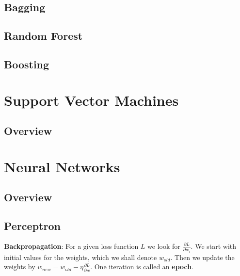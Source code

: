 \documentclass[aspectratio=169,10pt]{beamer}
\begin{document}
\subsection{Bagging}
\begin{frame}{\secname}{\subsecname}

\end{frame}

\subsection{Random Forest}
\begin{frame}{\secname}{\subsecname}

\end{frame}

\subsection{Boosting}
\begin{frame}{\secname}{\subsecname}

\end{frame}

\section{Support Vector Machines}

\subsection{Overview}
\begin{frame}{\secname}{\subsecname}
  
\end{frame}

\section{Neural Networks}

\subsection{Overview}
\begin{frame}{\secname}{\subsecname}
  
\end{frame}

\subsection{Perceptron}
\begin{frame}{\secname}{\subsecname}
    \textbf{Backpropagation}: For a given loss function $L$ we look for $\frac{\partial L}{\partial w_i}$.
    We start with initial values for the weights, which we shall denote $w_{old}$.
    Then we update the weights by $w_{new} = w_{old} - \eta \frac{\partial L}{\partial w}$.
    One iteration is called an \textbf{epoch}.
\end{frame}

{\aauwavesbg
\begin{frame}
\end{frame}}
\end{document}
